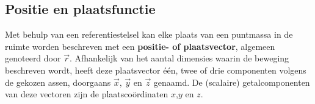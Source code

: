 \documentclass{ximera}
\begin{document}
	\author{Bart Lambregs, Vincent Gellens}
    \xmsource\xmuitleg




\subsection*{Positie en plaatsfunctie}

Met behulp van een referentiestelsel kan elke plaats van een puntmassa in de ruimte worden beschreven met een \textbf{positie- of plaatsvector}, algemeen genoteerd door $\vec{r}$.
Afhankelijk van het aantal dimensies waarin de beweging beschreven wordt, heeft deze plaatsvector één, twee of drie componenten volgens de gekozen assen, doorgaans \(\vec{x}\), \(\vec{y}\) en \(\vec{z}\) genaamd.
De (scalaire) getalcomponenten van deze vectoren zijn de plaatscoördinaten \(x\),\(y\) en \(z\).
\end{document}

